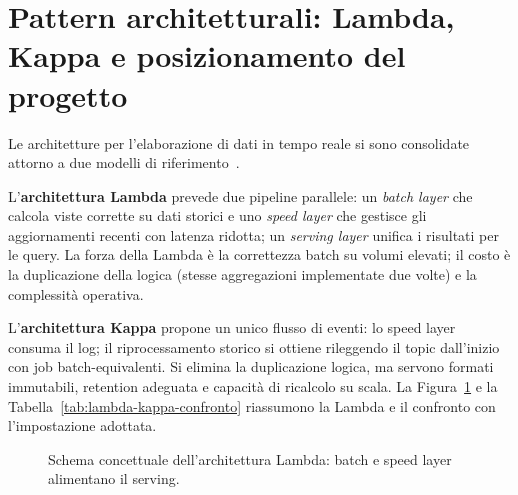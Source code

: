 \section{Pattern architetturali: Lambda, Kappa e posizionamento del progetto}\label{sec:lambda-kappa}

Le architetture per l'elaborazione di dati in tempo reale si sono consolidate attorno a due modelli di riferimento~\cite{marz2015big,kreps2014questioning,kleppmann2017designing}.

L'\textbf{architettura Lambda} prevede due pipeline parallele: un \emph{batch layer} che calcola viste corrette su dati storici e uno \emph{speed layer} che gestisce gli aggiornamenti recenti con latenza ridotta; un \emph{serving layer} unifica i risultati per le query.
La forza della Lambda è la correttezza batch su volumi elevati; il costo è la duplicazione della logica (stesse aggregazioni implementate due volte) e la complessità operativa.

L'\textbf{architettura Kappa} propone un unico flusso di eventi: lo speed layer consuma il log; il riprocessamento storico si ottiene rileggendo il topic dall'inizio con job batch-equivalenti.
Si elimina la duplicazione logica, ma servono formati immutabili, retention adeguata e capacità di ricalcolo su scala.
La Figura~\ref{fig:lambda-schema} e la Tabella~\ref{tab:lambda-kappa-confronto} riassumono la Lambda e il confronto con l'impostazione adottata.

\begin{figure}[H]
  \centering
  \caption{Schema concettuale dell'architettura Lambda: batch e speed layer alimentano il serving.}
  \label{fig:lambda-schema}
\end{figure}

